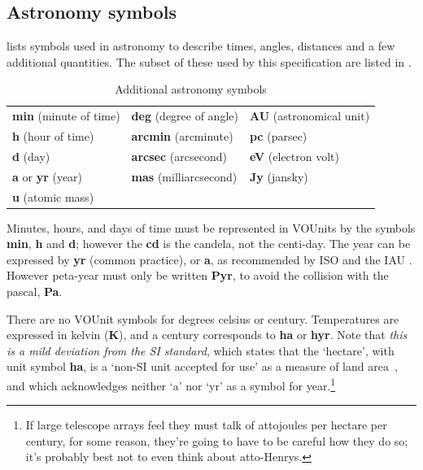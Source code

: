 \documentclass[11pt,notitlepage,onecolumn]{ivoa}
\newcommand{\unit}[1]{\textbf{\textsf{\color{orange}#1}}}
\begin{document}
\subsection{Astronomy symbols}

 lists symbols used in astronomy to
describe times, angles, distances and a few additional quantities.
The subset of these used by this specification are
listed in .

\begin{table}[ht]
\begin{center}
\begin{tabular}{|l|l|l|}\hline
\unit{min} (minute of time)	&\unit{deg} (degree of angle) 	&\unit{AU} (astronomical unit)     	\\
\unit{h} (hour of time)		&\unit{arcmin} (arcminute)    	&\unit{pc} (parsec) 	\\
\unit{d} (day)			&\unit{arcsec} (arcsecond)  	&\unit{eV} (electron volt)	\\
\unit{a} or \unit{yr} (year)	&\unit{mas} (milliarcsecond)    &\unit{Jy} (jansky) 	\\
\unit{u} (atomic mass)		&      				&	\\\hline
\end{tabular}
\end{center}
\caption{\label{tab:vouadopted}Additional astronomy symbols}
\end{table}


Minutes, hours, and days of time must be represented in VOUnits by the
symbols \unit{min}, \unit{h} and \unit{d}; however the \unit{cd} is
the candela, not the centi-day.  The year can be expressed by
\unit{yr} (common practice),
or \unit{a},
as recommended by ISO \citep[Annex C]{std:iso80000-3}
and the IAU \citep[Table 6]{wilkins89}.
However peta-year must only be written \unit{Pyr},
to avoid the collision with the pascal, \unit{Pa}.

There are no VOUnit symbols for degrees celsius or century.
Temperatures are expressed in kelvin (\unit{K}),
and a century corresponds to \unit{ha} or \unit{hyr}.
Note that \emph{this is a mild deviation from the SI standard},
which states that the `hectare', with unit symbol \unit{ha},
is a `non-SI unit accepted for use' as a measure of land area~\citep[table~6]{si-brochure},
and which acknowledges neither `a' nor `yr' as a symbol for year.\footnote{If
large telescope arrays feel they must talk of attojoules per
hectare per century, for some reason, they're going to have to be
careful how they do so; it's probably best not to even think about atto-Henrys.}
\end{document}
